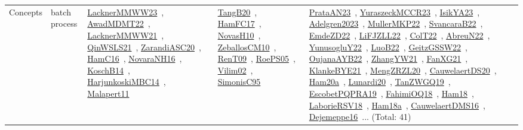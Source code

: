 {\begin{longtable}{lp{3cm}>{\raggedright\arraybackslash}p{6cm}>{\raggedright\arraybackslash}p{6cm}>{\raggedright\arraybackslash}p{8cm}}
\index{batch process}\index{Concepts!batch process}Concepts & batch process & \href{../works/LacknerMMWW23.pdf}{LacknerMMWW23}~\cite{LacknerMMWW23}, \href{../works/AwadMDMT22.pdf}{AwadMDMT22}~\cite{AwadMDMT22}, \href{../works/LacknerMMWW21.pdf}{LacknerMMWW21}~\cite{LacknerMMWW21}, \href{../works/QinWSLS21.pdf}{QinWSLS21}~\cite{QinWSLS21}, \href{../works/ZarandiASC20.pdf}{ZarandiASC20}~\cite{ZarandiASC20}, \href{../works/HamC16.pdf}{HamC16}~\cite{HamC16}, \href{../works/NovaraNH16.pdf}{NovaraNH16}~\cite{NovaraNH16}, \href{../works/KoschB14.pdf}{KoschB14}~\cite{KoschB14}, \href{../works/HarjunkoskiMBC14.pdf}{HarjunkoskiMBC14}~\cite{HarjunkoskiMBC14}, \href{../works/Malapert11.pdf}{Malapert11}~\cite{Malapert11} & \href{../works/TangB20.pdf}{TangB20}~\cite{TangB20}, \href{../works/HamFC17.pdf}{HamFC17}~\cite{HamFC17}, \href{../works/NovasH10.pdf}{NovasH10}~\cite{NovasH10}, \href{../works/ZeballosCM10.pdf}{ZeballosCM10}~\cite{ZeballosCM10}, \href{../works/RenT09.pdf}{RenT09}~\cite{RenT09}, \href{../works/RoePS05.pdf}{RoePS05}~\cite{RoePS05}, \href{../works/Vilim02.pdf}{Vilim02}~\cite{Vilim02}, \href{../works/SimonisC95.pdf}{SimonisC95}~\cite{SimonisC95} & \href{../works/PrataAN23.pdf}{PrataAN23}~\cite{PrataAN23}, \href{../works/YuraszeckMCCR23.pdf}{YuraszeckMCCR23}~\cite{YuraszeckMCCR23}, \href{../works/IsikYA23.pdf}{IsikYA23}~\cite{IsikYA23}, \href{../works/Adelgren2023.pdf}{Adelgren2023}~\cite{Adelgren2023}, \href{../works/MullerMKP22.pdf}{MullerMKP22}~\cite{MullerMKP22}, \href{../works/SvancaraB22.pdf}{SvancaraB22}~\cite{SvancaraB22}, \href{../works/EmdeZD22.pdf}{EmdeZD22}~\cite{EmdeZD22}, \href{../works/LiFJZLL22.pdf}{LiFJZLL22}~\cite{LiFJZLL22}, \href{../works/ColT22.pdf}{ColT22}~\cite{ColT22}, \href{../works/AbreuN22.pdf}{AbreuN22}~\cite{AbreuN22}, \href{../works/YunusogluY22.pdf}{YunusogluY22}~\cite{YunusogluY22}, \href{../works/LuoB22.pdf}{LuoB22}~\cite{LuoB22}, \href{../works/GeitzGSSW22.pdf}{GeitzGSSW22}~\cite{GeitzGSSW22}, \href{../works/OujanaAYB22.pdf}{OujanaAYB22}~\cite{OujanaAYB22}, \href{../works/ZhangYW21.pdf}{ZhangYW21}~\cite{ZhangYW21}, \href{../works/FanXG21.pdf}{FanXG21}~\cite{FanXG21}, \href{../works/KlankeBYE21.pdf}{KlankeBYE21}~\cite{KlankeBYE21}, \href{../works/MengZRZL20.pdf}{MengZRZL20}~\cite{MengZRZL20}, \href{../works/CauwelaertDS20.pdf}{CauwelaertDS20}~\cite{CauwelaertDS20}, \href{../works/Ham20a.pdf}{Ham20a}~\cite{Ham20a}, \href{../works/Lunardi20.pdf}{Lunardi20}~\cite{Lunardi20}, \href{../works/TanZWGQ19.pdf}{TanZWGQ19}~\cite{TanZWGQ19}, \href{../works/EscobetPQPRA19.pdf}{EscobetPQPRA19}~\cite{EscobetPQPRA19}, \href{../works/FahimiOQ18.pdf}{FahimiOQ18}~\cite{FahimiOQ18}, \href{../works/Ham18.pdf}{Ham18}~\cite{Ham18}, \href{../works/LaborieRSV18.pdf}{LaborieRSV18}~\cite{LaborieRSV18}, \href{../works/Ham18a.pdf}{Ham18a}~\cite{Ham18a}, \href{../works/CauwelaertDMS16.pdf}{CauwelaertDMS16}~\cite{CauwelaertDMS16}, \href{../works/Dejemeppe16.pdf}{Dejemeppe16}~\cite{Dejemeppe16}... (Total: 41)\\

\end{longtable}}
